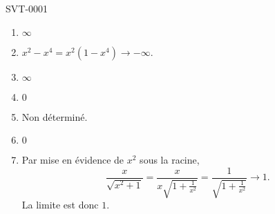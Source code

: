 
\begin{corrige}{SVT-0001}

    \begin{enumerate}
        \item
            \( \infty\)
        \item
            \( x^2-x^4=x^2(1-x^4)\to -\infty\).
        \item
            \( \infty\)
        \item
            \( 0\)
        \item
            Non déterminé.
        \item
            \( 0\)
        \item
            Par mise en évidence de \( x^2\) sous la racine,
            \begin{equation}
                \frac{ x }{ \sqrt{x^2+1} }=\frac{ x }{ x\sqrt{1+\frac{1}{ x^2 }} }=\frac{1}{ \sqrt{1+\frac{1}{ x^2 }} }\to 1.
            \end{equation}
            La limite est donc \( 1\).
    \end{enumerate}

\end{corrige}
